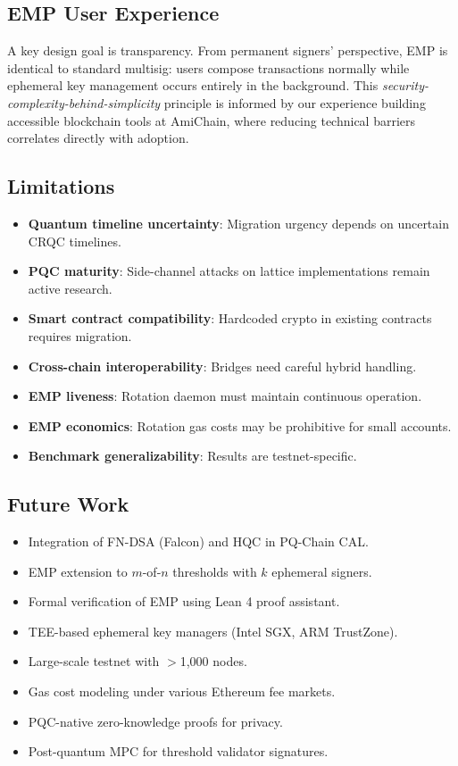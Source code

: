 \documentclass[12pt, a4paper, twocolumn]{article}
\begin{document}
\subsection{EMP User Experience}

A key design goal is transparency. From permanent signers' perspective, EMP is identical to standard multisig: users compose transactions normally while ephemeral key management occurs entirely in the background. This \emph{security-complexity-behind-simplicity} principle is informed by our experience building accessible blockchain tools at AmiChain, where reducing technical barriers correlates directly with adoption.

\subsection{Limitations}

\begin{itemize}[noitemsep]
  \item \textbf{Quantum timeline uncertainty}: Migration urgency depends on uncertain CRQC timelines.
  \item \textbf{PQC maturity}: Side-channel attacks on lattice implementations remain active research.
  \item \textbf{Smart contract compatibility}: Hardcoded crypto in existing contracts requires migration.
  \item \textbf{Cross-chain interoperability}: Bridges need careful hybrid handling.
  \item \textbf{EMP liveness}: Rotation daemon must maintain continuous operation.
  \item \textbf{EMP economics}: Rotation gas costs may be prohibitive for small accounts.
  \item \textbf{Benchmark generalizability}: Results are testnet-specific.
\end{itemize}

\subsection{Future Work}

\begin{itemize}[noitemsep]
  \item Integration of FN-DSA (Falcon) and HQC in PQ-Chain CAL.
  \item EMP extension to $m$-of-$n$ thresholds with $k$ ephemeral signers.
  \item Formal verification of EMP using Lean 4 proof assistant.
  \item TEE-based ephemeral key managers (Intel SGX, ARM TrustZone).
  \item Large-scale testnet with $>$1,000 nodes.
  \item Gas cost modeling under various Ethereum fee markets.
  \item PQC-native zero-knowledge proofs for privacy.
  \item Post-quantum MPC for threshold validator signatures.
\end{itemize}
\end{document}
